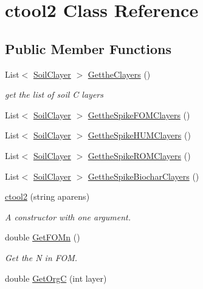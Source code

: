 \hypertarget{classctool2}{}\section{ctool2 Class Reference}
\label{classctool2}
\subsection*{Public Member Functions}
\begin{DoxyCompactItemize}
\item 
List$<$ \mbox{\hyperlink{class_soil_clayer}{Soil\+Clayer}} $>$ \mbox{\hyperlink{classctool2_a5a57b763bb7173f222b26f26f08102c0}{Getthe\+Clayers}} ()
\begin{DoxyCompactList}\small\item\em get the list of soil C layers \end{DoxyCompactList}\item 
List$<$ \mbox{\hyperlink{class_soil_clayer}{Soil\+Clayer}} $>$ \mbox{\hyperlink{classctool2_a219e077b022c6df25d58e7ec0db1f52c}{Getthe\+Spike\+F\+O\+M\+Clayers}} ()
\item 
List$<$ \mbox{\hyperlink{class_soil_clayer}{Soil\+Clayer}} $>$ \mbox{\hyperlink{classctool2_a719ddfdf8403e5233f03ebf9b8288c71}{Getthe\+Spike\+H\+U\+M\+Clayers}} ()
\item 
List$<$ \mbox{\hyperlink{class_soil_clayer}{Soil\+Clayer}} $>$ \mbox{\hyperlink{classctool2_ac8cf240ea485a4b04d6585e7c4383a33}{Getthe\+Spike\+R\+O\+M\+Clayers}} ()
\item 
List$<$ \mbox{\hyperlink{class_soil_clayer}{Soil\+Clayer}} $>$ \mbox{\hyperlink{classctool2_a4fd7ccfba014dfc2d72b273f1952f937}{Getthe\+Spike\+Biochar\+Clayers}} ()
\item 
\mbox{\hyperlink{classctool2_ab334aea1ee225ec86031984a2cf87577}{ctool2}} (string aparens)
\begin{DoxyCompactList}\small\item\em A constructor with one argument. \end{DoxyCompactList}\item 
double \mbox{\hyperlink{classctool2_a2b677a56b7667baa7811fef3646d6086}{Get\+F\+O\+Mn}} ()
\begin{DoxyCompactList}\small\item\em Get the N in F\+OM. \end{DoxyCompactList}\item 
double \mbox{\hyperlink{classctool2_a4fe5c0ef250c6b583869ea8f3a9bfaca}{Get\+OrgC}} (int layer)

\end{DoxyCompactItemize}
